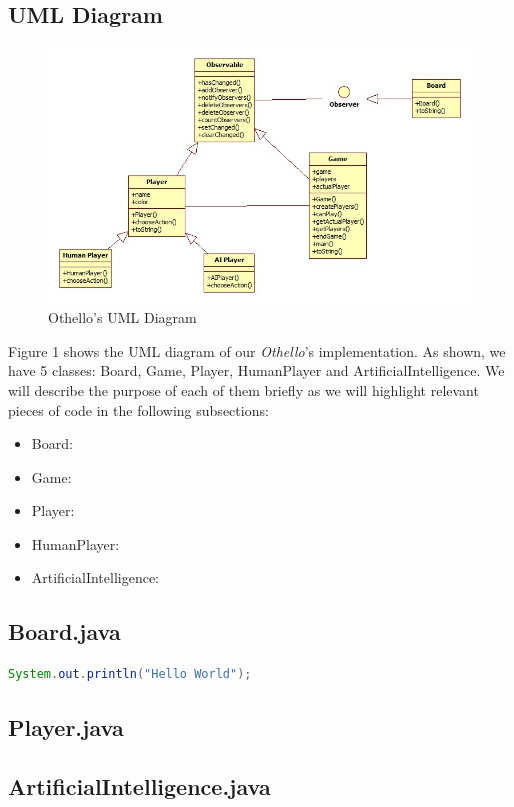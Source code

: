 \documentclass[12pt]{article}
\begin{document}
\subsection{UML Diagram}
\begin{figure}[h!]
	\includegraphics[scale=0.60]{Main.jpg}
	\caption{Othello's UML Diagram}
\end{figure}

\noindent Figure 1 shows the UML diagram of our \emph{Othello}'s implementation. As shown, we have 5 classes: Board, Game, Player, HumanPlayer and ArtificialIntelligence. We will describe the purpose of each of them briefly as we will highlight relevant pieces of code in the following subsections:
\begin{itemize}
	\item Board:
	\item Game:
	\item Player:
	\item HumanPlayer:
	\item ArtificialIntelligence:
\end{itemize} 
\subsection{Board.java}
\begin{lstlisting}[language=Java]
	System.out.println("Hello World");
\end{lstlisting}
\subsection{Player.java}
\subsection{ArtificialIntelligence.java}
\end{document}

